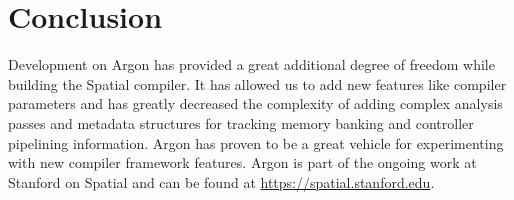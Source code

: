 \section{Conclusion}
Development on Argon has provided a great additional degree of freedom while
building the Spatial compiler. It has allowed us to add new features like
compiler parameters and has greatly decreased the complexity of adding
complex analysis passes and metadata structures for tracking memory banking
and controller pipelining information. Argon has proven to be a great vehicle
for experimenting with new compiler framework features. Argon is part of the ongoing
work at Stanford on Spatial and can be found at \url{https://spatial.stanford.edu}.
